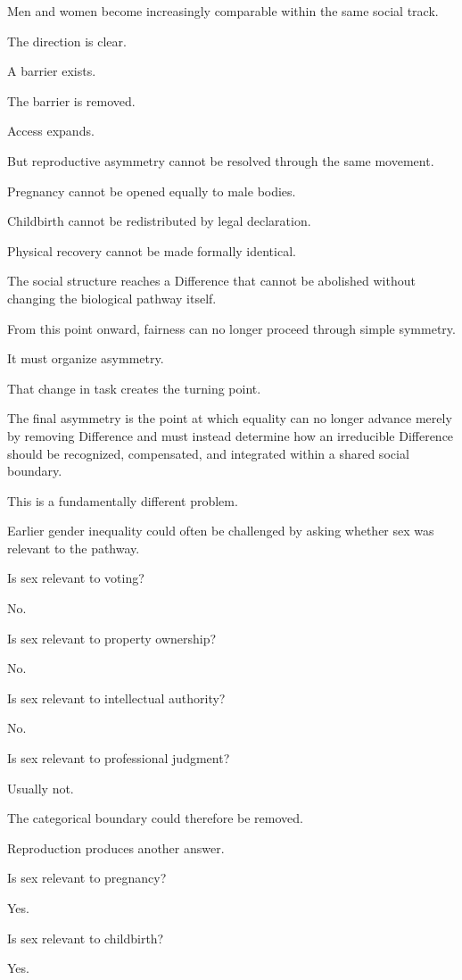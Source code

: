 Men and women become increasingly comparable within the same social track.

The direction is clear.

A barrier exists.

The barrier is removed.

Access expands.

But reproductive asymmetry cannot be resolved through the same movement.

Pregnancy cannot be opened equally to male bodies.

Childbirth cannot be redistributed by legal declaration.

Physical recovery cannot be made formally identical.

The social structure reaches a Difference that cannot be abolished without changing the biological pathway itself.

From this point onward, fairness can no longer proceed through simple symmetry.

It must organize asymmetry.

That change in task creates the turning point.

The final asymmetry is the point at which equality can no longer advance merely by removing Difference and must instead determine how an irreducible Difference should be recognized, compensated, and integrated within a shared social boundary.

This is a fundamentally different problem.

Earlier gender inequality could often be challenged by asking whether sex was relevant to the pathway.

Is sex relevant to voting?

No.

Is sex relevant to property ownership?

No.

Is sex relevant to intellectual authority?

No.

Is sex relevant to professional judgment?

Usually not.

The categorical boundary could therefore be removed.

Reproduction produces another answer.

Is sex relevant to pregnancy?

Yes.

Is sex relevant to childbirth?

Yes.

